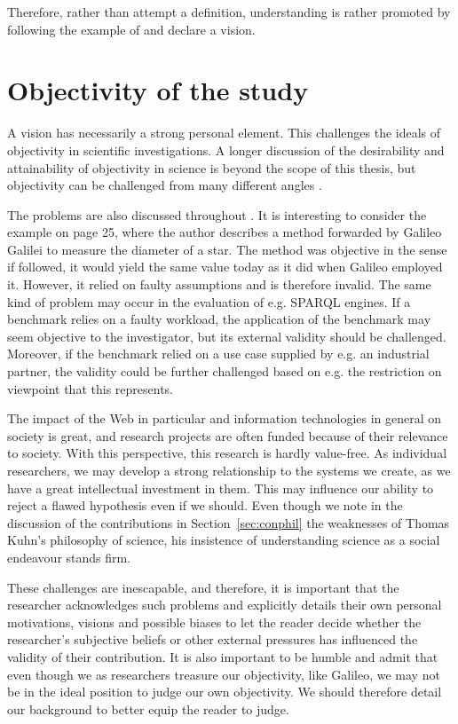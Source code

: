 Therefore, rather than attempt a definition, understanding is rather
promoted by following the example of \cite{berners2001semantic} and
declare a vision.


\section{Objectivity of the study}\label{sec:objectivity}

A vision has necessarily a strong personal element. This challenges
the ideals of objectivity in scientific investigations. A longer
discussion of the desirability and attainability of objectivity in
science is beyond the scope of this thesis, but objectivity can be
challenged from many different angles
\cite{sep-scientific-objectivity}.

The problems are also discussed throughout
\cite{chalmers1999whatis}. It is interesting to consider the example
on page 25, where the author describes a method forwarded by Galileo
Galilei to measure the diameter of a star. The method was objective in
the sense if followed, it would yield the same value today as it did
when Galileo employed it. However, it relied on faulty assumptions and
is therefore invalid. The same kind of problem may occur in the
evaluation of e.g. SPARQL engines. If a benchmark relies on a faulty
workload, the application of the benchmark may seem objective to the
investigator, but its external validity should be
challenged. Moreover, if the benchmark relied on a use case supplied
by e.g. an industrial partner, the validity could be further
challenged based on e.g. the restriction on viewpoint that this
represents.

The impact of the Web in particular and information technologies in
general on society is great, and research projects are often funded
because of their relevance to society. With this perspective, this
research is hardly value-free. As individual researchers, we may
develop a strong relationship to the systems we create, as we have a
great intellectual investment in them. This may influence our ability
to reject a flawed hypothesis even if we should. Even though we note
in the discussion of the contributions in Section~\ref{sec:conphil}
the weaknesses of Thomas Kuhn's philosophy of science, his insistence
of understanding science as a social endeavour stands firm.

These challenges are inescapable, and therefore, it is important that
the researcher acknowledges such problems and explicitly details their
own personal motivations, visions and possible biases to let the
reader decide whether the researcher's subjective beliefs or other
external pressures has influenced the validity of their
contribution. It is also important to be humble and admit that even
though we as researchers treasure our objectivity, like Galileo, we
may not be in the ideal position to judge our own objectivity. We
should therefore detail our background to better equip the reader to
judge.

